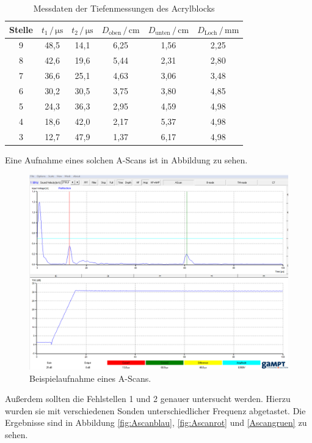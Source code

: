 \begin{table}
\centering
\caption{Messdaten der Tiefenmessungen des Acrylblocks}
\label{tab:mess2}
\begin{tabular}{c c c c c c}
\toprule
Stelle & $t_1 \,/\, \si{\micro\second}$ & $t_2 \,/\, \si{\micro\second}$ &$D_\text{oben} \,/\, \si{\centi\meter}$&$D_\text{unten} \,/\, \si{\centi\meter}$ & $D_\text{Loch} \,/\, \si{\milli\meter}$\\
\midrule 
9 & 48,5 & 14,1 & 6,25 & 1,56 & 2,25 \\
8 & 42,6 & 19,6 & 5,44 & 2,31 & 2,80\\
7 & 36,6 & 25,1 & 4,63 & 3,06 & 3,48\\
6 & 30,2 & 30,5 & 3,75 & 3,80 & 4,85\\
5 & 24,3 & 36,3 & 2,95 & 4,59 & 4,98\\
4 & 18,6 & 42,0 & 2,17 & 5,37 & 4,98\\
3 & 12,7 & 47,9 & 1,37 & 6,17 & 4,98\\
\bottomrule
\end{tabular}
\end{table}

Eine Aufnahme eines solchen A-Scans ist in Abbildung  zu sehen. 

\begin{figure}
  \centering
  \includegraphics[scale=0.3]{content/Ascan.PNG}
  \caption{Beispielaufnahme eines A-Scans.}
  \label{fig:Ascan}
\end{figure}

Außerdem sollten die Fehlstellen 1 und 2 genauer untersucht werden. Hierzu wurden sie mit verschiedenen 
Sonden unterschiedlicher Frequenz abgetastet. Die Ergebnisse sind in Abbildung \ref{fig:Ascanblau},
\ref{fig:Ascanrot} und \ref{Ascangruen} zu sehen.

